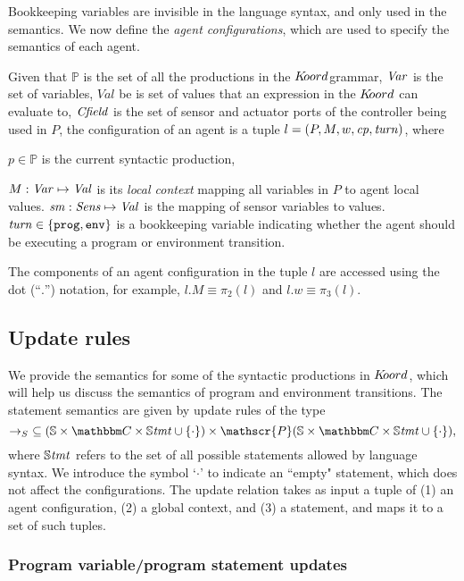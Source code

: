 Bookkeeping variables are invisible in the language syntax, and only used in the semantics. We now define the \emph{agent configurations}, which are used to specify the semantics of each agent. \newline


Given that $\mathbb{P}$ is the set of all the productions in the $K\kern-2pt oord$grammar, $\mathit{Var}$ is the set of variables, $Val$ be is set of values that an expression in the $K\kern-2pt oord$ can evaluate to, $\mathit{Cfield}$ is the set of sensor and actuator ports of the controller being used in $P$, the configuration of an agent is a tuple $ l = (P, {M},{w},\mathit{cp},\mathit{turn})$, where\newline


 $p \in \mathbb{P}$ is the current syntactic production,\newline

 ${M} : \mathit{Var} \mapsto \mathit{Val}$ is its {\em local context\/} mapping all variables in $P$ to agent local values.
\newline
 $\mathit{sm} : \mathit{Sens} \mapsto \mathit{Val}$ is the mapping of sensor variables to values.
\newline
 $\mathit{turn} \in \{\mathtt{prog,env}\}$ is a bookkeeping variable indicating whether the agent should be executing a program or environment transition. 

The components of an agent configuration in the tuple $l$ are accessed
using the dot (``$.$'') notation, for example, $l.M\equiv
\pi_2(l)$ and $l.w \equiv \pi_3(l)$.
\subsection{Update rules}
We provide the semantics for some of the syntactic productions in $K\kern-2pt oord$, which will help us discuss the semantics of program and environment transitions. The statement semantics are given by update rules of the type
$$\stmtrule\ \subseteq (\pws \times \pwl\times \pwstmt \cup \{\cdot\}) \times \mathscr{P}(\pws\times \pwl \times \pwstmt \cup \{\cdot\}),$$
where $\mathbb{S\mathit{tmt}}$ refers to the set of all possible statements allowed by language syntax. We introduce the symbol `$\cdot$' to indicate an ``empty" statement, which does not affect the configurations. The update relation takes as input a tuple of (1) an agent configuration, (2) a global context, and (3) a statement, and maps it to a set of such tuples. 

\subsubsection{Program variable/program statement updates}

